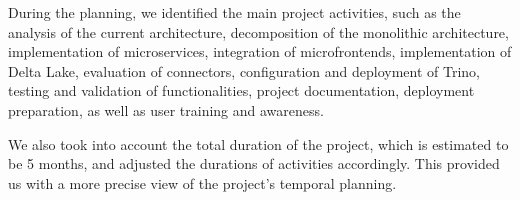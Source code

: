 During the planning, we identified the main project activities, such as the analysis of the current architecture, decomposition of the monolithic architecture, implementation of microservices, integration of microfrontends, implementation of Delta Lake, evaluation of connectors, configuration and deployment of Trino, testing and validation of functionalities, project documentation, deployment preparation, as well as user training and awareness.

We also took into account the total duration of the project, which is estimated to be 5 months, and adjusted the durations of activities accordingly. This provided us with a more precise view of the project's temporal planning.